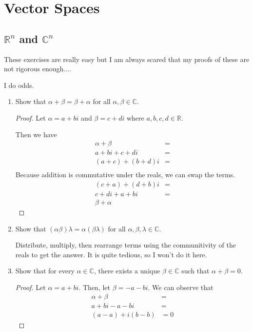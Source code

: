 \clearpage
\section{Vector Spaces}

\subsection{$\mathbb{R}^n$ and $\mathbb{C}^n$}

These exercises are really easy but I am always scared that my proofs of these are not rigorous enough....

I do odds.

\begin{enumerate}
    \item[1] Show that $\alpha + \beta = \beta + \alpha$ for all $\alpha, \beta \in \mathbb{C}$.
    
    \begin{proof}
        Let $\alpha = a + bi$ and $\beta = c + di$ where $a, b, c, d \in \mathbb{R}$.

        Then we have 
        \begin{align*}
            \alpha + \beta &= \\
            a + bi + c + di &= \\ 
            (a + c) + (b + d)i &= \\
        \end{align*}
        Because addition is commutative under the reals, we can swap the terms.
        \begin{align*}
            (c + a) + (d + b)i &= \\
            c + di + a + bi &= \\
            \beta + \alpha  
        \end{align*}
    \end{proof}

    \item[3] Show that $(\alpha\beta)\lambda = \alpha(\beta\lambda)$ for all $\alpha, \beta, \lambda \in \mathbb{C}$.

    Distribute, multiply, then rearrange terms using the communitivity of the reals to get the answer. It is quite tedious, so I won't do it here.

    \item[5] Show that for every $\alpha \in \mathbb{C}$, there exists a unique $\beta \in \mathbb{C}$ such that $\alpha + \beta = 0$.
    
    \begin{proof}
        Let $\alpha = a + bi$. Then, let $\beta = -a - bi$. We can observe that 
        \begin{align*}
            \alpha + \beta &= \\
            a + bi - a - bi &= \\
            (a - a) + i(b - b) &= 0
        \end{align*}
    \end{proof}


\end{enumerate}
